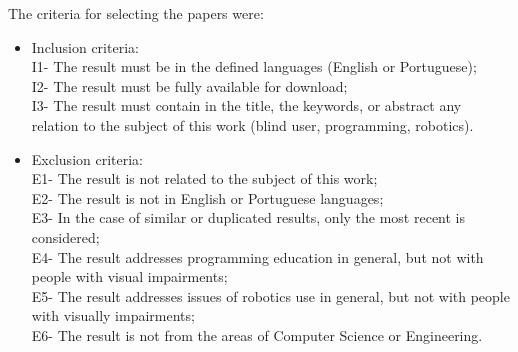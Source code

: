 The criteria for selecting the papers were:
\begin{itemize}


    \item Inclusion criteria: \\
    I1- The result must be in the defined languages (English or Portuguese); \\
    I2- The result must be fully available for download; \\
    I3- The result must contain in the title, the keywords, or abstract any relation to the subject of this work (blind user, programming, robotics). \\

    \item Exclusion criteria: \\
    E1- The result is not related to the subject of this work; \\
    E2- The result is not in English or Portuguese languages; \\
    E3- In the case of similar or duplicated results, only the most recent is considered; \\
    E4- The result addresses programming education in general, but not with people with visual impairments; \\
    E5- The result addresses issues of robotics use in general, but  not with people with visually impairments; \\
    E6- The result is not from the areas of Computer Science or Engineering.
\end{itemize}


